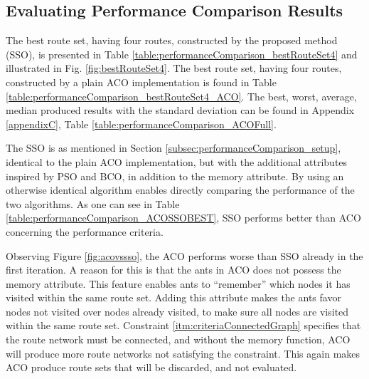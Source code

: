 \subsection{Evaluating Performance Comparison Results}
\label{subsec:evaluating_PerfomanceComparison}


The best route set, having four routes, constructed by the proposed method (SSO), is presented in Table \vref{table:performanceComparison_bestRouteSet4} and illustrated in Fig. \vref{fig:bestRouteSet4}. The best route set, having four routes, constructed by a plain ACO implementation is found in Table \vref{table:performanceComparison_bestRouteSet4_ACO}. The best, worst, average, median produced results with the standard deviation can be found in Appendix \ref{appendixC}, Table \vref{table:performanceComparison_ACOFull}. 

The SSO is as mentioned in Section \vref{subsec:performanceComparison_setup}, identical to the plain ACO implementation, but with the additional attributes inspired by PSO and BCO, in addition to the memory attribute. By using an otherwise identical algorithm enables directly comparing the performance of the two algorithms. As one can see in Table \vref{table:performanceComparison_ACOSSOBEST}, SSO performs better than ACO concerning the performance criteria. 

Observing Figure \ref{fig:acovssso}, the ACO performs worse than SSO already in the first iteration. A reason for this is that the ants in ACO does not possess the memory attribute. This feature enables ants to ``remember'' which nodes it has visited within the same route set. Adding this attribute makes the ants favor nodes not visited over nodes already visited, to make sure all nodes are visited within the same route set. Constraint \vref{itm:criteriaConnectedGraph} specifies that the route network must be connected, and without the memory function, ACO will produce more route networks not satisfying the constraint. This again makes ACO produce route sets that will be discarded, and not evaluated. %

